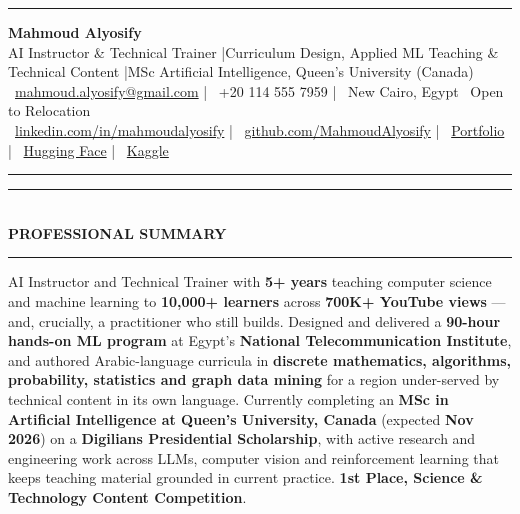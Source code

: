 \documentclass[10pt, a4paper]{article}
\newcommand{\faEnvelope}{}\newcommand{\faPhone}{}\newcommand{\faMapMarker}{}%
\newcommand{\faLinkedin}{}\newcommand{\faGithub}{}\newcommand{\faRobot}{}%
\newcommand{\faChartBar}{}\newcommand{\faGlobe}{}%
\newcommand{\cvsection}[1]{%
  \vspace{3pt}%
  {\color{navy}\rule{\linewidth}{1.1pt}}\\[0.5pt]%
  {\color{navy}\bfseries\fontsize{9.5}{11}\selectfont\uppercase{#1}}\\[-4pt]%
  {\color{teal}\rule{\linewidth}{0.6pt}}%
  \vspace{2pt}%
}
\begin{document}
\small

{\color{navy}\rule{\linewidth}{1.5pt}}

\vspace{3pt}
\begin{center}
  {\fontsize{21}{24}\bfseries\color{navy} Mahmoud Alyosify}\\[3pt]
  {\fontsize{10}{12}\color{teal}
    AI Instructor \& Technical Trainer \enspace|\enspace Curriculum Design, Applied ML Teaching \& Technical Content
    \enspace|\enspace MSc Artificial Intelligence, Queen's University (Canada)
}\\[4pt]
  {\color{midgray}
    \faEnvelope\ \href{mailto:mahmoud.alyosify@gmail.com}{mahmoud.alyosify@gmail.com}
    \enspace|\enspace
    \faPhone\ +20 114 555 7959
    \enspace|\enspace
    \faMapMarker\ New Cairo, Egypt \textperiodcentered\ Open to Relocation}\\[2pt]
  {\faLinkedin\ \href{https://linkedin.com/in/mahmoudalyosify}{linkedin.com/in/mahmoudalyosify}
    \enspace|\enspace
    \faGithub\ \href{https://github.com/MahmoudAlyosify}{github.com/MahmoudAlyosify}
    \enspace|\enspace
    \faGlobe\ \href{https://mahmoudalyosifysite.github.io/}{Portfolio}
    \enspace|\enspace
    \faRobot\ \href{https://huggingface.co/mahmoudalyosify}{Hugging Face}
    \enspace|\enspace
    \faChartBar\ \href{https://kaggle.com/mahmoudalyosify}{Kaggle}}
\end{center}

{\color{navy}\rule{\linewidth}{1.5pt}}

\vspace{2pt}

\cvsection{Professional Summary}

{\color{darkgray}\justifying
AI Instructor and Technical Trainer with \textbf{5+ years} teaching computer science and machine learning to \textbf{10,000+ learners} across \textbf{700K+ YouTube views} --- and, crucially, a practitioner who still builds. Designed and delivered a \textbf{90-hour hands-on ML program} at Egypt's \textbf{National Telecommunication Institute}, and authored Arabic-language curricula in \textbf{discrete mathematics, algorithms, probability, statistics and graph data mining} for a region under-served by technical content in its own language. Currently completing an \textbf{MSc in Artificial Intelligence at Queen's University, Canada} (expected \textbf{Nov 2026}) on a \textbf{Digilians Presidential Scholarship}, with active research and engineering work across LLMs, computer vision and reinforcement learning that keeps teaching material grounded in current practice. \textbf{1st Place, Science \& Technology Content Competition}.}
\end{document}
